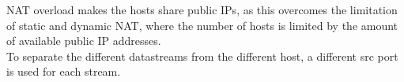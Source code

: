 NAT overload makes the hosts share public IPs, as this overcomes the limitation of static and dynamic NAT, where the number of hosts is limited by the amount of available public IP addresses. \\
To separate the different datastreams from the different host, a different src port is used for each stream.
